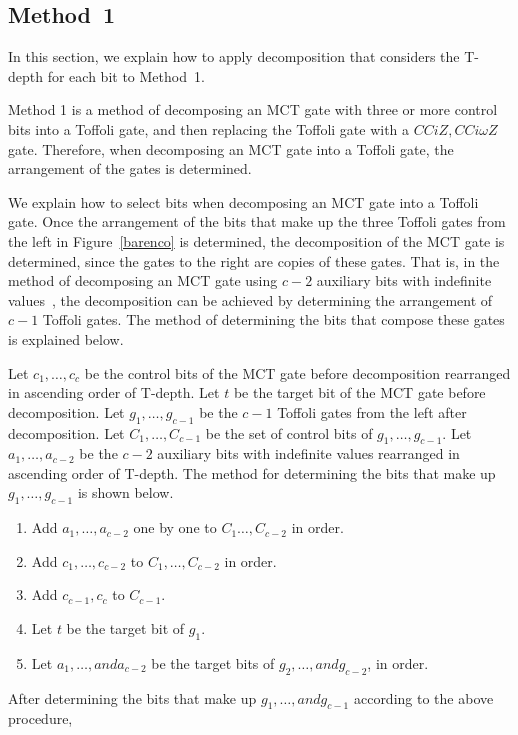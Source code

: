 \subsection{Method~1}
In this section, we explain how to apply decomposition that considers the T-depth for each bit to Method~1.
\par
Method 1 is a method of decomposing an MCT gate with three or more control bits into a Toffoli gate,
and then replacing the Toffoli gate with a $CCiZ, CCi\omega Z$ gate.
Therefore, when decomposing an MCT gate into a Toffoli gate,
the arrangement of the gates is determined.
\par
We explain how to select bits when decomposing an MCT gate into a Toffoli gate.
Once the arrangement of the bits that make up the three Toffoli gates 
from the left in Figure~\ref{barenco} is determined,
the decomposition of the MCT gate is determined, since the gates to the right are copies of these gates.
That is, in the method of decomposing an MCT gate using $c-2$ auxiliary bits with indefinite values~\cite{barenco1995elementary},
the decomposition can be achieved by determining the arrangement of $c-1$ Toffoli gates.
The method of determining the bits that compose these gates is explained below.
\par
Let $c_{1},\dots,c_{c}$ be the control bits of the MCT gate before decomposition
rearranged in ascending order of T-depth.
Let $t$ be the target bit of the MCT gate before decomposition.
Let $g_{1},\dots,g_{c-1}$ be the $c-1$ Toffoli gates from the left after decomposition.
Let $C_{1},\dots,C_{c-1}$ be the set of control bits of $g_{1},\dots,g_{c-1}$.
Let $a_{1},\dots,a_{c-2}$ be the $c-2$ auxiliary bits with indefinite values rearranged in ascending order of T-depth.
The method for determining the bits that make up $g_{1},\dots,g_{c-1}$ is shown below.
\begin{enumerate}[Step 1]
\item Add $a_{1},\dots,a_{c-2}$ one by one to $C_{1}\dots,C_{c-2}$ in order.
\item Add $c_{1},\dots,c_{c-2}$ to $C_{1},\dots,C_{c-2}$ in order.
\item Add $c_{c-1},c_{c}$ to $C_{c-1}$.
\item Let $t$ be the target bit of $g_{1}$.
\item Let $a_{1}, \dots, and a_{c-2}$ be the target bits of $g_{2}, \dots, and g_{c-2}$, in order.
\end{enumerate}
\par
After determining the bits that make up $g_{1}, \dots, and g_{c-1}$ according to the above procedure,

